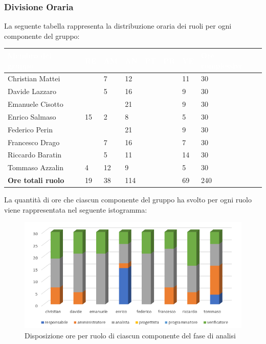 \subsubsection{Divisione Oraria}
La seguente tabella rappresenta la distribuzione oraria dei ruoli per ogni componente del gruppo:
\renewcommand{\arraystretch}{2}
\begin{table}[h!]
\centering
\caption{Tabella della divisione oraria di Analisi}	
\begin{longtable} { C{4cm} C{1cm} C{1cm} C{1cm} C{1cm} C{1cm} C{1cm} C{3cm}}

	\textcolor{white}{\textbf{Membro del gruppo}} & 
	\textcolor{white}{\textbf{RE}} & 
	\textcolor{white}{\textbf{AM}} & 
	\textcolor{white}{\textbf{AN}} & 
	\textcolor{white}{\textbf{PT}} & 
	\textcolor{white}{\textbf{PR}} & 
	\textcolor{white}{\textbf{VE}} & 
	\textcolor{white}{\textbf{Ore complessive}}\\	
\endhead        
        Christian Mattei     &  & 7 & 12 &  & & 11 & 30 \\
		Davide Lazzaro       &  & 5 & 16 &  &  & 9 & 30 \\
        Emanuele Cisotto     &  &  & 21 &  &  & 9 & 30 \\
        Enrico Salmaso       & 15 & 2 & 8  &  &  & 5 & 30 \\
        Federico Perin       &  &  & 21 &  &  & 9 & 30 \\
        Francesco Drago      &  & 7 & 16 &  &  & 7 & 30 \\
        Riccardo Baratin     &  & 5 & 11 &  &  & 14 & 30 \\
        Tommaso Azzalin      & 4 & 12 & 9  &  &  & 5 & 30 \\
        \textbf{Ore totali ruolo} & 19 & 38 & 114 &  &  & 69 & 240 \\
        
\end{longtable}
\end{table}
\newline
La quantità di ore che ciascun componente del gruppo ha svolto per ogni ruolo viene rappresentata nel seguente istogramma:
\begin{figure}[h]
	\centering
	\caption{Disposizione ore per ruolo di ciascun componente del fase di analisi}
	\includegraphics[scale=2]{sezioni/Istogrammi/IstogrammaAnalisi.png}
	
\end{figure}


